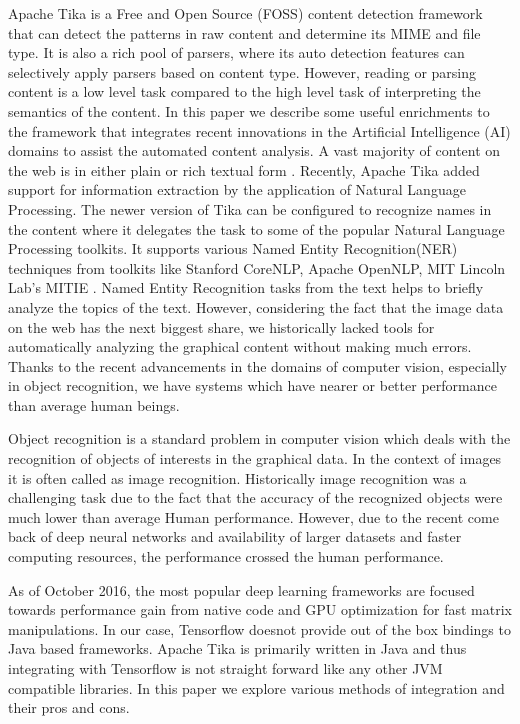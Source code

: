 \documentclass[letterpaper, 10 pt, conference]{ieeeconf}  %
\begin{document}
Apache Tika\cite{mattmann2011tika} is a Free and Open Source (FOSS) content detection framework that can detect the patterns in raw content and determine its MIME and file type. It is also a rich pool of parsers, where its auto detection features can selectively apply parsers based on content type. However, reading or parsing content is a low level task compared to the high level task of interpreting the semantics of the content. In this paper we describe some useful enrichments to the framework that integrates recent innovations in the Artificial Intelligence (AI) domains to assist the automated content analysis. A vast majority of content on the web is in either plain or rich textual form \cite{}. Recently, Apache Tika added support for information extraction by the application of Natural Language Processing\cite{}. The newer version of Tika can be configured to recognize names in the content where it delegates the task to some of the popular Natural Language Processing toolkits. It supports various Named Entity Recognition(NER) techniques from toolkits like Stanford CoreNLP\cite{}, Apache OpenNLP\cite{}, MIT Lincoln Lab's MITIE \cite{}. Named Entity Recognition tasks from the text helps to briefly analyze the topics of the text. However, considering the fact that the image data on the web has the next biggest share, we historically lacked tools for automatically analyzing the graphical content without making much errors. Thanks to the recent advancements in the domains of computer vision, especially in object recognition, we have systems which have nearer or better performance than average human beings.

Object recognition is a standard problem in computer vision which deals with the recognition of objects of interests in the graphical data. In the context of images it is often called as image recognition. Historically image recognition was a challenging task due to the fact that the accuracy of the recognized objects were much lower than average Human performance. However, due to the recent come back of deep neural networks and availability of larger datasets and faster computing resources, the performance crossed the human performance. 

As of October 2016, the most popular deep learning frameworks are focused towards performance gain from native code and GPU optimization for fast matrix manipulations\cite{}. In our case, Tensorflow doesnot provide out of the box bindings to Java based frameworks. Apache Tika is primarily written in Java and thus integrating with Tensorflow is not straight forward like any other JVM compatible libraries. In this paper we explore various methods of integration and their pros and cons. 
\end{document}
